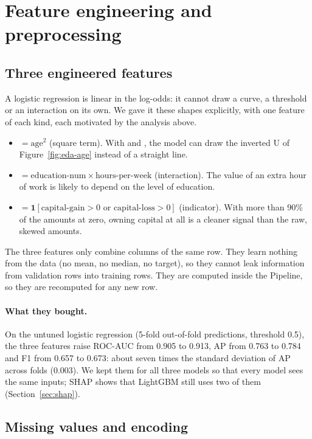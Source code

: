 \section{Feature engineering and preprocessing}
\label{sec:features}

\subsection{Three engineered features}

A logistic regression is linear in the log-odds: it cannot draw a curve, a
threshold or an interaction on its own. We gave it these shapes explicitly,
with one feature of each kind, each motivated by the analysis above.
\begin{itemize}
  \item {} $= \text{age}^2$ (square term). With  and
  , the model can draw the inverted U of
  Figure~\ref{fig:eda-age} instead of a straight line.
  \item {} $= \text{education-num} \times
  \text{hours-per-week}$ (interaction). The value of an extra hour of work is
  likely to depend on the level of education.
  \item {} $= \mathbf{1}[\text{capital-gain} > 0 \text{ or }
  \text{capital-loss} > 0]$ (indicator). With more than 90\% of the amounts at
  zero, owning capital at all is a cleaner signal than the raw, skewed amounts.
\end{itemize}
The three features only combine columns of the same row. They learn nothing
from the data (no mean, no median, no target), so they cannot leak information
from validation rows into training rows. They are computed inside the
Pipeline, so they are recomputed for any new row.

\paragraph{What they bought.} On the untuned logistic regression (5-fold
out-of-fold predictions, threshold 0.5), the three features raise ROC-AUC from
0.905 to 0.913, AP from 0.763 to 0.784 and F1 from 0.657 to 0.673: about seven
times the standard deviation of AP across folds (0.003). We kept them for all
three models so that every model sees the same inputs; SHAP shows that
LightGBM still uses two of them (Section~\ref{sec:shap}).

\subsection{Missing values and encoding}

